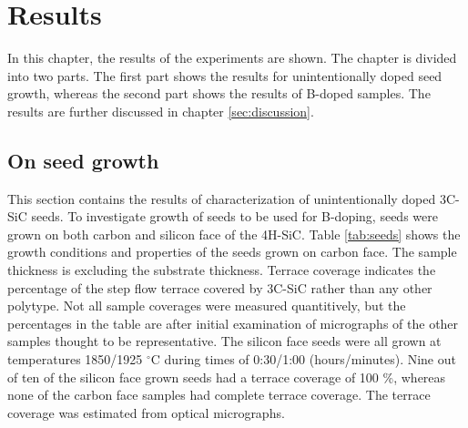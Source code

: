

	
	

	
	

\chapter{Results}
\label{sec:results}
In this chapter, the results of the experiments are shown. The chapter is divided into two parts. The first part shows the results for unintentionally doped seed growth, whereas the second part shows the results of B-doped samples. The results are further discussed in chapter \ref{sec:discussion}. 

\section{On seed growth}
\label{sec:results:seeds}
This section contains the results of characterization of unintentionally doped 3C-SiC seeds. To investigate growth of seeds to be used for B-doping, seeds were grown on both carbon and silicon face of the 4H-SiC. Table \ref{tab:seeds} shows the growth conditions and properties of the seeds grown on carbon face. The sample thickness is excluding the substrate thickness. Terrace coverage indicates the percentage of the step flow terrace covered by 3C-SiC rather than any other polytype. Not all sample coverages were measured quantitively, but the percentages in the table are after initial examination of micrographs of the other samples thought to be representative. The silicon face seeds were all grown at temperatures 1850/1925 $^\circ$C during times of 0:30/1:00 (hours/minutes). Nine out of ten of the silicon face grown seeds had a terrace coverage of 100 \%, whereas none of the carbon face samples had complete terrace coverage. The terrace coverage was estimated from optical micrographs.

